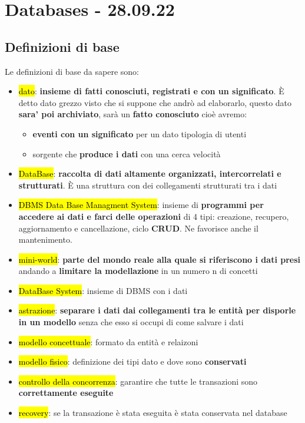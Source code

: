 
\section{Databases - 28.09.22}

\subsection{Definizioni di base}

Le definizioni di base da sapere sono:
\begin{itemize}
	\item \hl{dato}: \textbf{insieme di fatti conosciuti, registrati e con un significato}. È detto dato grezzo visto che si suppone che andrò ad elaborarlo, questo dato \textbf{sara' poi archiviato}, sarà un \textbf{fatto conosciuto} cioè avremo:
		\begin{itemize}
			\item \textbf{eventi con un significato} per un dato tipologia di utenti 
			\item sorgente che \textbf{produce i dati} con una cerca velocità
		\end{itemize}
	
	\item \hl{DataBase}: \textbf{raccolta di dati altamente organizzati, intercorrelati e strutturati}. È una struttura con dei collegamenti strutturati tra i dati

	\item \hl{DBMS Data Base Managment System}: insieme di \textbf{programmi per accedere ai dati e farci delle operazioni} di 4 tipi: creazione, recupero, aggiornamento e cancellazione, ciclo \textbf{CRUD}. Ne favorisce anche il mantenimento.

	\item \hl{mini-world}: \textbf{parte del mondo reale alla quale si riferiscono i dati presi} andando a \textbf{limitare la modellazione} in un numero n di concetti

	\item \hl{DataBase System}: insieme di DBMS con i dati
	
	\item \hl{astrazione}: \textbf{separare i dati dai collegamenti tra le entità per disporle in un modello} senza che esso si occupi di come salvare i dati
	
	\item \hl{modello concettuale}: formato da entità e relaizoni
	
	\item \hl{modello fisico}: definizione dei tipi dato e dove sono \textbf{conservati}
	
	\item \hl{controllo della concorrenza}: garantire che tutte le transazioni sono \textbf{correttamente eseguite}
	
	\item \hl{recovery}: se la transazione è stata eseguita è stata conservata nel database
\end{itemize}


